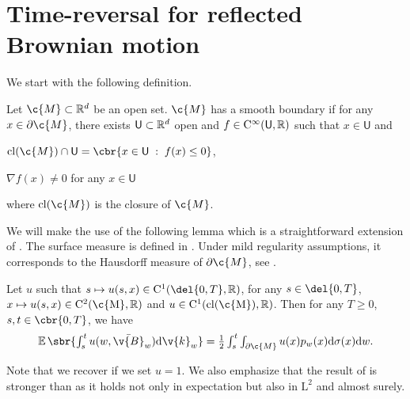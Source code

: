 \section{Time-reversal for reflected Brownian motion}
\label{sec:time-revers-refl}

We start with the following definition.

\begin{definition}
	Let $\c{M} \subset \R^d$ be an open set.
	$\c{M}$ has a smooth boundary if for any
	$x \in \partial \c{M}$, there exists $\mathsf{U} \subset \mathbb{R}^d$ open and
	$f \in \mathrm{C}^\infty(\mathsf{U}, \mathbb{R})$ such that $x \in \mathsf{U}$ and
	\begin{enumerate*}[label=(\alph*)]
		\item $\mathrm{cl}(\c{M}) \cap \mathsf{U} = \cbr{x \in \mathsf{U} \; : \; f(x) \leq 0}$,
		\item $\nabla f(x) \neq 0$ for any $x \in \mathsf{U}$
	\end{enumerate*}
	where $\mathrm{cl}(\c{M})$ is the closure of $\c{M}$.
\end{definition}

We will make the use of the following lemma which is a straightforward extension of \textcite[Theorem 2.6]{burdzy2004heat}.
The surface measure is defined in \cite[Proposition 2.43]{lee2006riemannian}.
Under mild regularity assumptions, it corresponds to the Hausdorff measure of $\partial \c{M}$, see \cite{evans2015measure}.

\begin{lemma}
	\label{lemma:formula_integration}
	Let $u$ such that $s \mapsto u(s,x) \in \mathrm{C}^1(\del{0,T}, \R)$, for any $s \in \del{0,T}$, $x \mapsto u(s,x) \in \mathrm{C}^2(\mathrm{\c{M}}, \R)$ and $u \in \mathrm{C}^1(\mathrm{cl}(\mathrm{\c{M}}), \R)$.
	Then for any $T \geq 0$, $s, t \in \cbr{0,T}$, we have \begin{equation} \textstyle{\E\sbr{\int_s^t u(w, \bar{\v{B}}_w) \mathrm{d} \v{k}_w } = \tfrac{1}{2} \int_s^t \int_{\partial \c{M}} u(x) p_w(x) \mathrm{d} \sigma(x) \mathrm{d} w .
		}
	\end{equation}
\end{lemma}

Note that we recover \textcite[Theorem 2.6]{burdzy2004heat} if we set $u=1$.
We also emphasize that the result of \textcite[Theorem 2.6]{burdzy2004heat} is stronger than  as it holds not only in expectation but also in $\mathrm{L}^2$ and almost surely.

